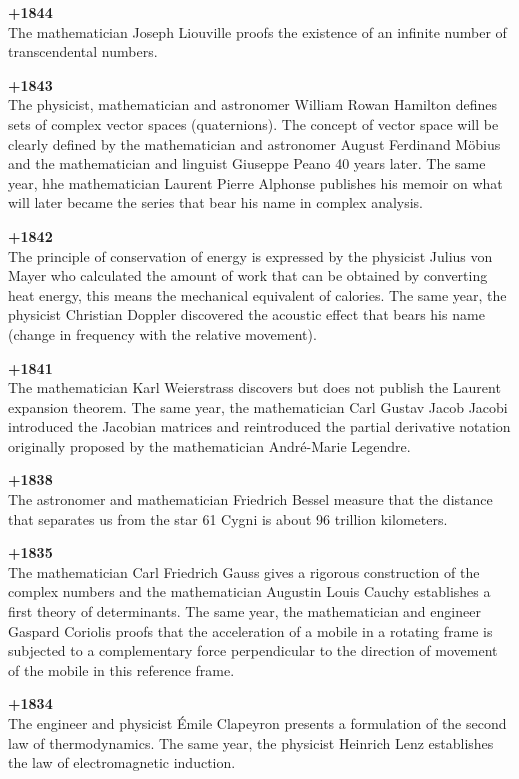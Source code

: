 \textbf{+1844}\\
The mathematician Joseph Liouville proofs the existence of an infinite number of transcendental numbers.

\textbf{+1843}\\
The physicist, mathematician and astronomer William Rowan Hamilton defines sets of complex vector spaces (quaternions). The concept of vector space will be clearly defined by the mathematician and astronomer August Ferdinand Möbius and the mathematician and linguist Giuseppe Peano 40 years later. The same year, hhe mathematician Laurent Pierre Alphonse publishes his memoir on what will later became the series that bear his name in complex analysis.

\textbf{+1842}\\
The principle of conservation of energy is expressed by the physicist Julius von Mayer who calculated the amount of work that can be obtained by converting heat energy, this means the mechanical equivalent of calories. The same year, the physicist Christian Doppler discovered the acoustic effect that bears his name (change in frequency with the relative movement).

\textbf{+1841}\\
The mathematician Karl Weierstrass discovers but does not publish the Laurent expansion theorem. The same year, the mathematician Carl Gustav Jacob Jacobi introduced the Jacobian matrices and reintroduced the partial derivative notation originally proposed by the mathematician André-Marie Legendre.

\textbf{+1838}\\
The astronomer and mathematician Friedrich Bessel measure that the distance that separates us from the star 61 Cygni is about 96 trillion kilometers.

\textbf{+1835}\\
The mathematician Carl Friedrich Gauss gives a rigorous construction of the complex numbers and the mathematician Augustin Louis Cauchy establishes a first theory of determinants. The same year, the mathematician and engineer Gaspard Coriolis proofs that the acceleration of a mobile in a rotating frame is subjected to a complementary force perpendicular to the direction of movement of the mobile in this reference frame.

\textbf{+1834}\\
The engineer and physicist Émile Clapeyron presents a formulation of the second law of thermodynamics. The same year, the physicist Heinrich Lenz establishes the law of electromagnetic induction.

